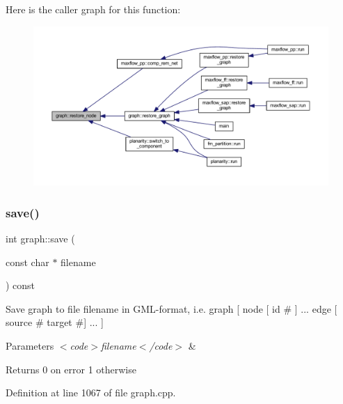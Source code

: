 Here is the caller graph for this function\+:
\nopagebreak
\begin{figure}[H]
\begin{center}
\leavevmode
\includegraphics[width=350pt]{classgraph_ab57aab79e649cc275052b7decbdd03ec_icgraph}
\end{center}
\end{figure}
\mbox{\label{classgraph_a7bd0712a528249d1585085a64ac3e661}} 
\subsubsection{\texorpdfstring{save()}{save()}\hspace{0.1cm}{\footnotesize\ttfamily [1/2]}}
{\footnotesize\ttfamily int graph\+::save (\begin{DoxyParamCaption}\item[{const char $\ast$}]{filename }\end{DoxyParamCaption}) const\hspace{0.3cm}{\ttfamily [inherited]}}

Save graph to file {\ttfamily filename} in G\+M\+L-\/format, i.\+e. {\ttfamily graph \mbox{[} node \mbox{[} id \# \mbox{]} ... edge \mbox{[} source \# target \#\mbox{]} ... \mbox{]}}


\begin{DoxyParams}{Parameters}
{\em $<$code$>$filename$<$/code$>$} & \\
\hline
\end{DoxyParams}
\begin{DoxyReturn}{Returns}
0 on error 1 otherwise 
\end{DoxyReturn}


Definition at line 1067 of file graph.\+cpp.


